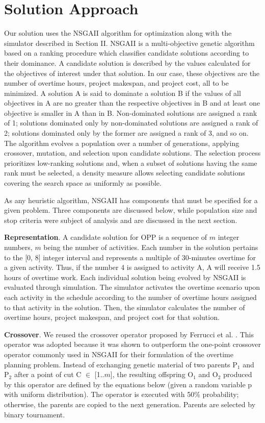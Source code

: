 \documentclass[conference]{IEEEtran}
\begin{document}
\section{Solution Approach}
Our solution uses the NSGAII algorithm for optimization along with the simulator described in Section II. NSGAII \cite{deb:2002} is a multi-objective genetic algorithm based on a ranking procedure which classifies candidate solutions according to their dominance. A candidate solution is described by the values calculated for the objectives of interest under that solution. In our case, these objectives are the number of overtime hours, project makespan, and project cost, all to be minimized. A solution A is said to dominate a solution B if the values of all objectives in A are no greater than the respective objectives in B and at least one objective is smaller in A than in B. Non-dominated solutions are assigned a rank of 1; solutions dominated only by non-dominated solutions are assigned a rank of 2; solutions dominated only by the former are assigned a rank of 3, and so on. The algorithm evolves a population over a number of generations, applying crossover, mutation, and selection upon candidate solutions. The selection process prioritizes low-ranking solutions and, when a subset of solutions having the same rank must be selected, a density measure allows selecting candidate solutions covering the search space as uniformly as possible. 

As any heuristic algorithm, NSGAII has components that must be specified for a given problem. Three components are discussed below, while population size and stop criteria were subject of analysis and are discussed in the next section.

\vspace{3px}
\noindent
\textbf{Representation}. A candidate solution for OPP is a sequence of $m$ integer numbers, $m$ being the number of activities. Each number in the solution pertains to the [0, 8] integer interval and represents a multiple of 30-minutes overtime for a given activity. Thus, if the number 4 is assigned to activity A, A will receive 1.5 hours of overtime work. Each individual solution being evolved by NSGAII is evaluated through simulation. The simulator activates the overtime scenario upon each activity in the schedule according to the number of overtime hours assigned to that activity in the solution. Then, the simulator calculates the number of overtime hours, project makespan, and project cost for that solution.

\vspace{3px}
\noindent
\textbf{Crossover}. We reused the crossover operator proposed by Ferrucci et al. \cite{Ferrucci:2013}. This operator was adopted because it was shown to outperform the one-point crossover operator commonly used in NSGAII for their formulation of the overtime planning problem. Instead of exchanging genetic material of two parents P$_{1}$ and P$_{2}$ after a point of cut C $\in$ [1..$m$], the resulting offspring O$_{1}$ and O$_{2}$ produced by this operator are defined by the equations below (given a random variable p with uniform distribution). The operator is executed with 50\% probability; otherwise, the parents are copied to the next generation. Parents are selected by binary tournament.
\end{document}
